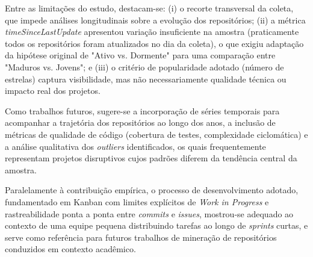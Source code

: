 \documentclass[
	article,			%
	11pt,				%
	oneside,			%
	a4paper,			%
	english,			%
	brazil,				%
	sumario=tradicional
	]{abntex2}
\begin{document}
Entre as limitações do estudo, destacam-se: (i) o recorte transversal da coleta, que impede análises longitudinais sobre a evolução dos repositórios; (ii) a métrica \textit{timeSinceLastUpdate} apresentou variação insuficiente na amostra (praticamente todos os repositórios foram atualizados no dia da coleta), o que exigiu adaptação da hipótese original de "Ativo vs. Dormente" para uma comparação entre "Maduros vs. Jovens"; e (iii) o critério de popularidade adotado (número de estrelas) captura visibilidade, mas não necessariamente qualidade técnica ou impacto real dos projetos.

Como trabalhos futuros, sugere-se a incorporação de séries temporais para acompanhar a trajetória dos repositórios ao longo dos anos, a inclusão de métricas de qualidade de código (cobertura de testes, complexidade ciclomática) e a análise qualitativa dos \textit{outliers} identificados, os quais frequentemente representam projetos disruptivos cujos padrões diferem da tendência central da amostra.

Paralelamente à contribuição empírica, o processo de desenvolvimento adotado, fundamentado em Kanban com limites explícitos de \textit{Work in Progress} e rastreabilidade ponta a ponta entre \textit{commits} e \textit{issues}, mostrou-se adequado ao contexto de uma equipe pequena distribuindo tarefas ao longo de \textit{sprints} curtas, e serve como referência para futuros trabalhos de mineração de repositórios conduzidos em contexto acadêmico.


%
%





\end{document}
